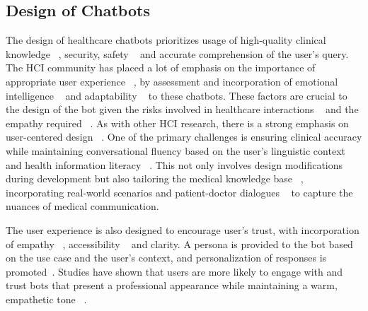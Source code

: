 \subsection{Design of Chatbots}
The design of healthcare chatbots prioritizes usage of high-quality clinical knowledge ~\cite{singhal2023large, denecke2021evaluation}, security, safety ~\cite{li2023security, abbasian2024foundation} and accurate comprehension of the user's query. The HCI community has placed a lot of emphasis on the importance of appropriate user experience ~\cite{hornbaek2017technology, hassenzahl2006user}, by assessment and incorporation of emotional intelligence ~\cite{bilquise2022emotionally, ghandeharioun2019towards, pamungkas2019emotionally} and adaptability ~\cite{nadarzynski2023but} to these chatbots. These factors are crucial to the design of the bot given the risks involved in healthcare interactions ~\cite{sepahpour2020ethical, li2023security} and the empathy required ~\cite{alam2022examining, seitz2024artificial, seitz2021empathic}. As with other HCI research, there is a strong emphasis on user-centered design ~\cite{abras2004user, soloway1994learner}. One of the primary challenges is ensuring clinical accuracy while maintaining conversational fluency based on the user’s linguistic context ~\cite{chavesling, spilnertalk2021} and health information literacy ~\cite{abreu2024utilization}. This not only involves design modifications during development but also tailoring the medical knowledge base ~\cite{8418155, chung2019chatbot}, incorporating real-world scenarios and patient-doctor dialogues ~\cite{chaix2019chatbots, chung2019chatbot} to capture the nuances of medical communication. 

The user experience is also designed to encourage user’s trust, with incorporation of empathy ~\cite{seitz2021empathic, seitz2024artificial,10.1145/3613904.3642336}, accessibility ~\cite{habicht2024closing, stanley2022chatbot} and clarity.  A persona is provided to the bot based on the use case and the user’s context, and personalization of responses is promoted~\cite{nissen2022effects, hwang2021applying}. Studies have shown that users are more likely to engage with and trust bots that present a professional appearance while maintaining a warm, empathetic tone ~\cite{seitz2021empathic, seitz2024artificial}. 

